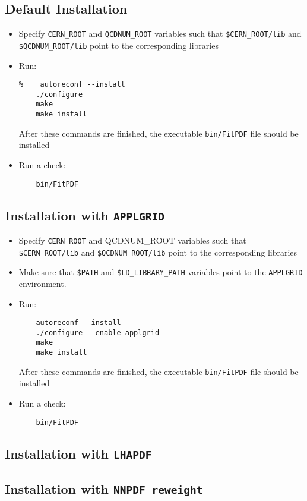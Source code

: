 \documentclass[11pt,a4paper]{article}
\begin{document}
\subsection{Default Installation}
\begin{itemize}
\item
 Specify {\tt CERN\_ROOT} 
     and {\tt QCDNUM\_ROOT} variables such that 
     {\tt \$CERN\_ROOT/lib}  and {\tt \$QCDNUM\_ROOT/lib}
 point to the corresponding libraries
\item Run:
\begin{verbatim}
%    autoreconf --install
    ./configure
    make 
    make install
\end{verbatim}
After these commands are finished, the executable {\tt bin/FitPDF} 
file should be installed
\item  Run a check:
\begin{verbatim}
    bin/FitPDF 
\end{verbatim}
\end{itemize}
\subsection{Installation with {\tt APPLGRID}}
\begin{itemize}
\item
 Specify {\tt CERN\_ROOT} and {QCDNUM\_ROOT} variables such that 
     {\tt \$CERN\_ROOT/lib}  and {\tt \$QCDNUM\_ROOT/lib}
 point to the corresponding libraries
\item Make sure that {\tt \$PATH} and {\tt \$LD\_LIBRARY\_PATH} 
variables point to the {\tt APPLGRID} environment.
\item Run:
\begin{verbatim}
    autoreconf --install
    ./configure --enable-applgrid
    make 
    make install
\end{verbatim}
After these commands are finished, the executable {\tt bin/FitPDF} 
file should be installed
\item  Run a check:
\begin{verbatim}
    bin/FitPDF 
\end{verbatim}
\end{itemize}
\subsection{Installation with {\tt LHAPDF}}
\subsection{Installation with {\tt NNPDF reweight}}
\end{document}
